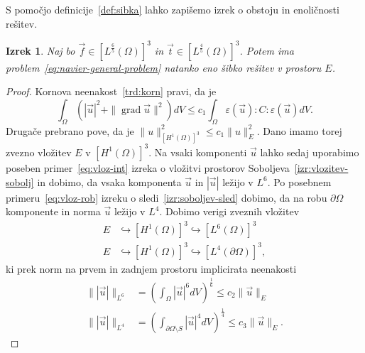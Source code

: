 \documentclass[12pt,a4paper,twoside]{article}
\theoremstyle{definition} %
\theoremstyle{plain} %
\newtheorem{izrek}[definicija]{Izrek}
\numberwithin{equation}{section}
\newcommand{\grad}{\operatorname{grad}}
\newcommand{\eps}{\varepsilon}
\newcommand{\vt}{\vec{t}}
\newcommand{\vu}{\vec{u}}
\newcommand{\vf}{\vec{f}}
\begin{document}
S pomočjo definicije~\ref{def:sibka} lahko zapišemo izrek o obstoju in enoličnosti rešitev.
\begin{izrek}
  \label{izr:enol-obst}
  Naj bo $\vf \in [L^\frac65(\Omega)]^3$ in $\vt \in [L^{\frac45}(\Omega)]^3$.
  Potem ima problem~\ref{eq:navier-general-problem} natanko eno šibko rešitev v
  prostoru $E$.
\end{izrek}
\begin{proof}
Kornova neenakost~\ref{trd:korn} pravi, da je
\begin{equation*}
   \int_{\Omega} (|\vu|^2 + \|\grad \vu\|^2) dV \leq c_1 \int_{\Omega} \eps(\vu):C:\eps(\vu)dV.
\end{equation*}
Drugače prebrano pove, da je $\|u\|_{[H^1(\Omega)]^3}^2 \leq c_1 \|u\|_E^2$.  Dano imamo torej
zvezno vložitev $E$ v $[H^1(\Omega)]^3$. Na vsaki komponenti $\vu$ lahko sedaj uporabimo poseben
primer~\eqref{eq:vloz-int} izreka o vložitvi prostorov Soboljeva~\ref{izr:vlozitev-sobolj} in dobimo,
da vsaka komponenta $\vu$ in $|\vu|$ ležijo v $L^6$. Po posebnem primeru~\eqref{eq:vloz-rob} izreku
o sledi~\ref{izr:soboljev-sled} dobimo, da na robu $\partial\Omega$ komponente in norma $\vu$ ležijo
v $L^4$. Dobimo verigi zveznih vložitev
\begin{align*}
  E &\hookrightarrow [H^1(\Omega)]^3 \hookrightarrow [L^6(\Omega)]^3 \\
  E &\hookrightarrow [H^1(\Omega)]^3 \hookrightarrow [L^4(\partial\Omega)]^3,
\end{align*}
ki prek norm na prvem in zadnjem prostoru implicirata neenakosti
\begin{align*}
  \||\vu|\|_{L^6} &= \left( \int_{\Omega} |\vu|^6 dV \right)^\frac16 \leq
  c_2 \|\vu\|_E \\
  \||\vu|\|_{L^4} &= \left( \int_{\partial\Omega\setminus S} |\vu|^4 dV \right)^\frac14 \leq
  c_3 \|\vu\|_E.
\end{align*}


\end{proof}
\end{document}
